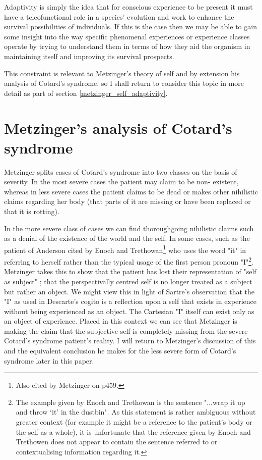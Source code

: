 Adaptivity is simply the idea that for conscious experience to be present it must have a teleofunctional role in a species' evolution and work to enhance the survival possibilities of individuals. If this is the case then we may be able to gain some insight into the way specific phenomenal experiences or experience classes operate by trying to understand them in terms of how they aid the organism in maintaining itself and improving its survival prospects.

This constraint is relevant to Metzinger's theory of self and by extension his analysis of Cotard's syndrome, so I shall return to consider this topic in more detail as part of section \ref{metzinger_self_adaptivity}.

\section{Metzinger's analysis of Cotard's syndrome}

Metzinger splits cases of Cotard's syndrome into two classes on the basis of severity. In the most severe cases the patient may claim to be non- existent, whereas in less severe cases the patient claims to be dead or makes other nihilistic claims regarding her body (that parts of it are missing or have been replaced or that it is rotting).

In the more severe class of cases we can find thoroughgoing nihilistic claims such as a denial of the existence of the world and the self. In some cases, such as the patient of Anderson cited by Enoch and Trethowan\footnote{Also cited by Metzinger on p459.} \cite[p. 173]{enoch1991} who uses the word "it" in referring to herself rather than the typical usage of the first person pronoun "I"\footnote{The example given by Enoch and Trethowan \cite{enoch1991} is the sentence "...wrap it up and throw ‘it' in the dustbin". As this statement is rather ambiguous without greater context (for example it might be a reference to the patient's body or the self as a whole), it is unfortunate that the reference given by Enoch and Trethowen \cite[p. 136]{tissot1921delire} does not appear to contain the sentence referred to or contextualising information regarding it.}. Metzinger takes this to show that the patient has lost their representation of "self as subject" \cite[p. 461]{metzinger2003}; that the perspectivally centred self is no longer treated as a subject but rather an object. We might view this in light of Sartre's \cite{sartre1956}\cite{sartre1972} observation that the "I" as used in Descarte's cogito \cite{descartes1998} is a reflection upon a self that exists in experience without being experienced as an object. The Cartesian "I" itself can exist only as an object of experience. Placed in this context we can see that Metzinger is making the claim that the subjective self is completely missing from the severe Cotard's syndrome patient's reality. I will return to Metzinger's discussion of this and the equivalent conclusion he makes for the less severe form of Cotard's syndrome later in this paper.

